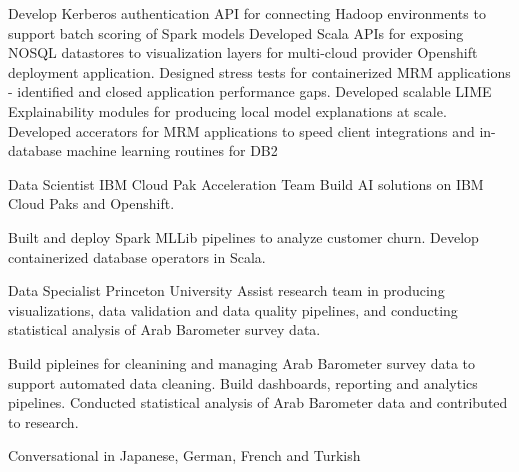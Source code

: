 \documentclass[a4paper]{Resume}
\begin{document}
{Develop Kerberos authentication API for connecting Hadoop environments to support batch scoring of Spark models}
{Developed Scala APIs for exposing NOSQL datastores to visualization layers for multi-cloud provider Openshift deployment application.}
{Designed stress tests for containerized MRM applications - identified and closed application performance gaps.}
{Developed scalable LIME Explainability modules for producing local model explanations at scale.}
{Developed accerators for MRM applications to speed client integrations and in-database machine learning routines for DB2}


{Data Scientist}
{IBM Cloud Pak Acceleration Team}
{Build AI solutions on IBM Cloud Paks and Openshift.}

{Built and deploy Spark MLLib pipelines to analyze customer churn.}
{Develop containerized database operators in Scala.}


{Data Specialist}
{Princeton University}
{Assist research team in producing visualizations, data validation and data quality pipelines, and conducting statistical analysis of Arab Barometer survey data.}

{Build pipleines for cleanining and managing Arab Barometer survey data to support automated data cleaning.}
{Build dashboards, reporting and analytics pipelines. Conducted statistical analysis of Arab Barometer data and contributed to research.}




         

		  {Conversational  in Japanese,}
		  {German,}
		  {French and}
		  {Turkish}
          
\clearpage
 
\end{document}
